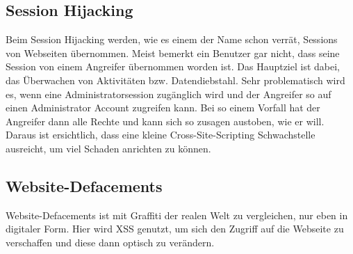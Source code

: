 \subsection{Session Hijacking}
\label{sec:xss_session_hijacking}
Beim Session Hijacking werden, wie es einem der Name schon verrät, Sessions von Webseiten übernommen. Meist bemerkt ein Benutzer gar nicht, dass seine Session von einem Angreifer übernommen worden ist. Das Hauptziel ist dabei, das Überwachen von Aktivitäten bzw. Datendiebstahl. Sehr problematisch wird es, wenn eine Administratorsession zugänglich wird und der Angreifer so auf einen Administrator Account zugreifen kann. Bei so einem Vorfall hat der Angreifer dann alle Rechte und kann sich so zusagen austoben, wie er will. Daraus ist ersichtlich, dass eine kleine Cross-Site-Scripting Schwachstelle ausreicht, um viel Schaden anrichten zu können. 
\subsection{Website-Defacements}
\label{sec:xss_web_def}
Website-Defacements ist mit Graffiti der realen Welt zu vergleichen, nur eben in digitaler Form. Hier wird XSS genutzt, um sich den Zugriff auf die Webseite zu verschaffen und diese dann optisch zu verändern. 
